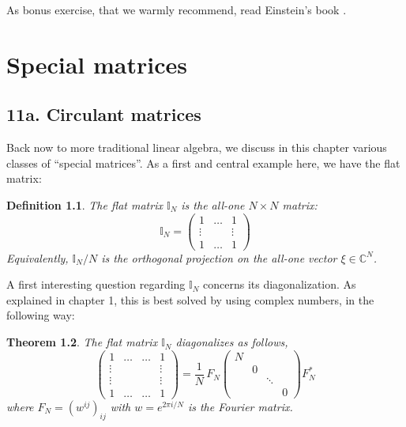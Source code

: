 \documentclass[12pt]{amsbook}
\newtheorem{theorem}{Theorem}[chapter]
\newtheorem{definition}[theorem]{Definition}
\begin{document}
As bonus exercise, that we warmly recommend, read Einstein's book \cite{ein}.

\chapter{Special matrices}

\section*{11a. Circulant matrices}

Back now to more traditional linear algebra, we discuss in this chapter various classes of ``special matrices''. As a first and central example here, we have the flat matrix:


\begin{definition}
The flat matrix $\mathbb I_N$ is the all-one $N\times N$ matrix:
$$\mathbb I_N=\begin{pmatrix}
1&\ldots&1\\
\vdots&&\vdots\\
1&\ldots&1\end{pmatrix}$$
Equivalently, $\mathbb I_N/N$ is the orthogonal projection on the all-one vector $\xi\in\mathbb C^N$.
\end{definition}

A first interesting question regarding $\mathbb I_N$ concerns its diagonalization. As explained in chapter 1, this is best solved by using complex numbers, in the following way:


\begin{theorem}
The flat matrix $\mathbb I_N$ diagonalizes as follows,
$$\begin{pmatrix}
1&\ldots&\ldots&1\\
\vdots&&&\vdots\\
\vdots&&&\vdots\\
1&\ldots&\ldots&1\end{pmatrix}
=\frac{1}{N}\,F_N
\begin{pmatrix}
N\\
&0\\
&&\ddots\\
&&&0\end{pmatrix}F_N^*$$
where $F_N=(w^{ij})_{ij}$ with $w=e^{2\pi i/N}$ is the Fourier matrix.
\end{theorem}
\end{document}
